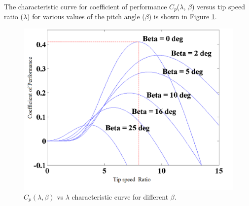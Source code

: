 The characteristic curve for coefficient of  performance $C_p$($\lambda$, $\beta$) versus tip speed ratio ($\lambda$) for various values of the pitch angle ($\beta$) is shown in Figure \ref{Figure:3}.
\begin{center} \begin{figure}
\includegraphics[width=12cm,keepaspectratio]{3.png}
\caption{$C_p(\lambda,\beta)$ vs $\lambda$ characteristic curve for different $\beta$. \cite{RefJ11}}
\label{Figure:3}    
\end{figure} \end{center}
